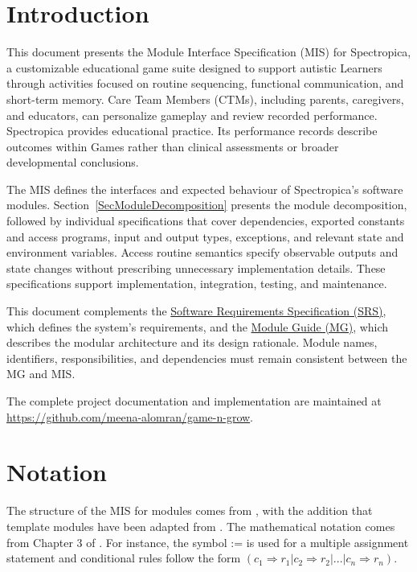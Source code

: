 \documentclass[12pt, titlepage]{article}
\begin{document}
\tableofcontents

\newpage


\section{Introduction}

This document presents the Module Interface Specification (MIS) for
Spectropica, a customizable educational game suite designed to support
autistic Learners through activities focused on routine sequencing,
functional communication, and short-term memory. Care Team Members (CTMs),
including parents, caregivers, and educators, can personalize gameplay
and review recorded performance. Spectropica provides educational practice.
Its performance records describe outcomes within Games rather than clinical
assessments or broader developmental conclusions.

The MIS defines the interfaces and expected behaviour of Spectropica's
software modules. Section~\ref{SecModuleDecomposition} presents the module
decomposition, followed by individual specifications that cover dependencies,
exported constants and access programs, input and output types, exceptions,
and relevant state and environment variables. Access routine semantics
specify observable outputs and state changes without prescribing unnecessary
implementation details. These specifications support implementation,
integration, testing, and maintenance.

This document complements the
\href{https://github.com/meena-alomran/game-n-grow/blob/main/pdfs/SRS-IEEE/SRS.pdf}
  {Software Requirements Specification (SRS)}, which defines the system's
requirements, and the
\href{https://github.com/meena-alomran/game-n-grow/blob/main/pdfs/Design/SoftArchitecture/MG.pdf}
  {Module Guide (MG)}, which describes the modular architecture and its
design rationale. Module names, identifiers, responsibilities, and
dependencies must remain consistent between the MG and MIS.

The complete project documentation and implementation are maintained at
\url{https://github.com/meena-alomran/game-n-grow}.

\section{Notation}

The structure of the MIS for modules comes from \citet{HoffmanAndStrooper1995},
with the addition that template modules have been adapted from
\cite{GhezziEtAl2003}.  The mathematical notation comes from Chapter 3 of
\citet{HoffmanAndStrooper1995}.  For instance, the symbol := is used for a
multiple assignment statement and conditional rules follow the form $(c_1
\Rightarrow r_1 | c_2 \Rightarrow r_2 | ... | c_n \Rightarrow r_n )$.
\end{document}
